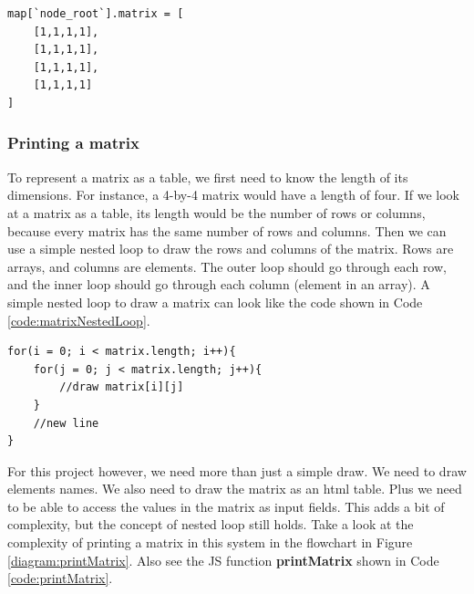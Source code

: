 \documentclass[11pt]{article} %
\begin{document}
\begin{minipage}[c]{\linewidth}
\begin{lstlisting}[basicstyle=\scriptsize, tabsize=4, frame=single, caption=Matrix Example 2, label=code:matrixExample2]
map[`node_root`].matrix = [
	[1,1,1,1],
	[1,1,1,1],
	[1,1,1,1],
	[1,1,1,1]
]
\end{lstlisting}
\end{minipage}

\subsubsection{Printing a matrix}

To represent a matrix as a table, we first need to know the length of its dimensions. For instance, a 4-by-4 matrix would have a length of four. If we look at a matrix as a table, its length would be the number of rows or columns, because every matrix has the same number of rows and columns. Then we can use a simple nested loop to draw the rows and columns of the matrix. Rows are arrays, and columns are elements. The outer loop should go through each row, and the inner loop should go through each column (element in an array).
A simple nested loop to draw a matrix can look like the code shown in Code \ref{code:matrixNestedLoop}.

\noindent
\begin{minipage}[c]{\linewidth}
\begin{lstlisting}[basicstyle=\scriptsize, tabsize=4, frame=single, caption=Matrix  nested loop, label=code:matrixNestedLoop]
for(i = 0; i < matrix.length; i++){
	for(j = 0; j < matrix.length; j++){
		//draw matrix[i][j]
	}
	//new line
}

\end{lstlisting}
\end{minipage}

\noindent
For this project however, we need more than just a simple draw. We need to draw elements names. We also need to draw the matrix as an html table. Plus we need to be able to access the values in the matrix as input fields. This adds a bit of complexity, but the concept of nested loop still holds. Take a look at the complexity of printing a matrix in this system in the flowchart in Figure \ref{diagram:printMatrix}. Also see the JS function \textbf{printMatrix} shown in Code \ref{code:printMatrix}.
\end{document}
